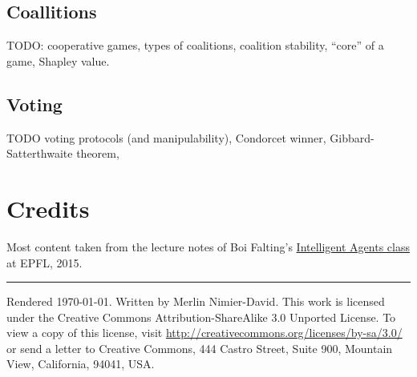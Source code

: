 \documentclass[10pt,a4paper,landscape]{article}
\begin{document}
\begin{multicols*}{4}
\subsection{Coallitions}

TODO: cooperative games, types of coalitions, coalition stability, ``core'' of a game, Shapley value.

\subsection{Voting}

TODO voting protocols (and manipulability), Condorcet winner, Gibbard-Satterthwaite theorem,

\newpage



\section{Credits}
Most content taken from the lecture notes of Boi Falting's \href{http://edu.epfl.ch/coursebook/en/intelligent-agents-CS-430}{Intelligent Agents class} at EPFL, 2015.

\vspace{0.5cm}
\hrule
\vspace{0.5cm}
\tiny
Rendered \today. Written by Merlin Nimier-David.
This work is licensed under the Creative Commons Attribution-ShareAlike 3.0 Unported License.
To view a copy of this license, visit \href{http://creativecommons.org/licenses/by-sa/3.0/}{http://creativecommons.org/licenses/by-sa/3.0/} or
send a letter to Creative Commons, 444 Castro Street, Suite 900, Mountain View, California, 94041, USA.
\end{multicols*}
\end{document}
